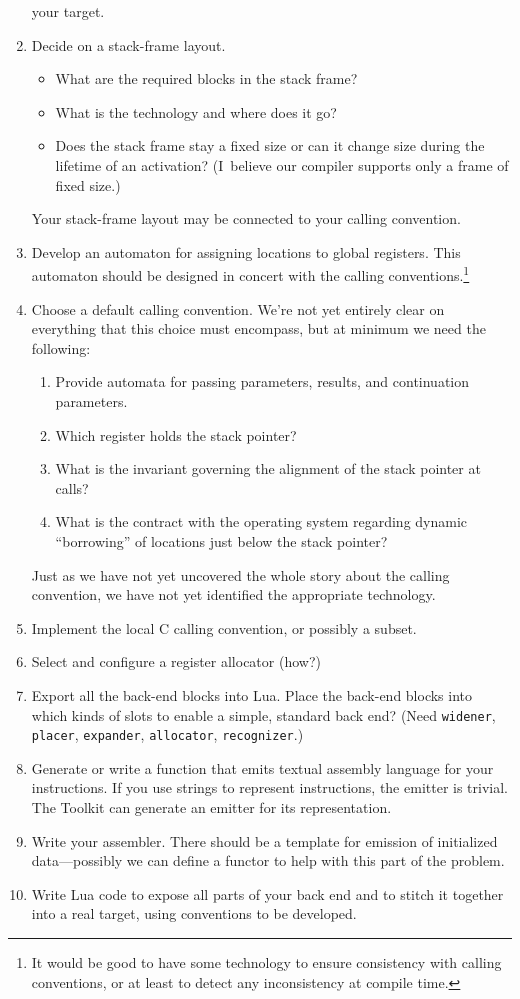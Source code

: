 \documentclass[12pt]{article}
\begin{document}
\begin{enumerate}
your target.
\item
Decide on a stack-frame layout.
\begin{itemize}
\item
What are the required blocks in the stack frame?
\item
What is the technology and where does it go?
\item
Does the stack frame stay a fixed size or can it change size during
the lifetime of an activation? 
(I~believe our compiler supports only a frame of fixed size.)
\end{itemize}
Your stack-frame layout may be connected to your calling convention.
\item
Develop an automaton for assigning locations to global registers.
This automaton should be designed in concert with the calling
conventions.\footnote
{It would be good to have some technology to ensure consistency with
calling conventions, or at least to detect any inconsistency at
compile time.}
\item
Choose a default calling convention.
We're not yet entirely clear on everything that this choice must
encompass, but at minimum we need the following:
\begin{enumerate}
\item
Provide automata for passing parameters, results, and continuation parameters.
\item
Which register holds the stack pointer?
\item
What is the invariant governing the alignment of the stack pointer at
calls?
\item
What is the contract with the operating system regarding dynamic
``borrowing'' of locations just below the stack pointer?
\end{enumerate}
Just as we have not yet uncovered the whole story about the calling
convention, we have not yet identified the appropriate technology.
\item
Implement the local C calling convention, or possibly a subset.
\item
Select and configure a register allocator (how?)
\item
Export all the back-end blocks into Lua.
Place the back-end blocks into which kinds of slots to enable a
simple, standard back end?
(Need \texttt{widener}, \texttt{placer}, \texttt{expander},
\texttt{allocator}, \texttt{recognizer}.)
\item
Generate or write a function that emits textual assembly language for
your instructions.
If you use strings to represent instructions, the emitter is trivial.
The Toolkit can generate an emitter for its representation.
\item
Write your assembler.
There should be a template for emission of initialized data---possibly
we can define a functor to help with this part of the problem.
\item
Write Lua code to expose all parts of your back end and to stitch it
together into a real target, using conventions to be developed.
\end{enumerate}
\end{document}
